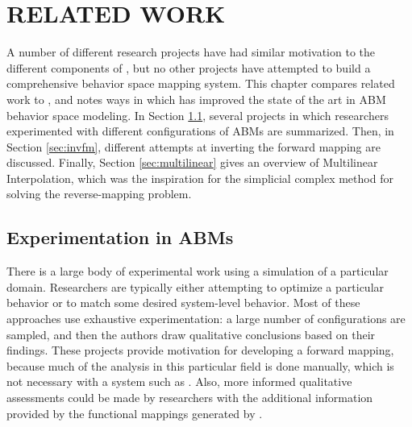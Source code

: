\chapter{RELATED WORK}
\thispagestyle{plain}

\label{RelatedWork}

A number of different research projects have had similar motivation to the different components of \fw, but no other projects have attempted to build a comprehensive behavior space mapping system.
This chapter compares related work to \fw, and notes ways in which \fw has improved the state of the art in ABM behavior space modeling.
In Section \ref{sec:abmexp}, several projects in which researchers experimented with different configurations of ABMs are summarized.
Then, in Section \ref{sec:invfm}, different attempts at inverting the forward mapping are discussed.
Finally, Section \ref{sec:multilinear} gives an overview of Multilinear Interpolation, which was the inspiration for the simplicial complex method for solving the reverse-mapping problem.

\section{Experimentation in ABMs}
\label{sec:abmexp}

There is a large body of experimental work using a simulation of a particular domain.
Researchers are typically either attempting to optimize a particular behavior or to match some desired system-level behavior.
Most of these approaches use exhaustive experimentation: a large number of configurations are sampled, and then the authors draw qualitative conclusions based on their findings.
These projects provide motivation for developing a forward mapping, because much of the analysis in this particular field is done manually, which is not necessary with a system such as \fw.
Also, more informed qualitative assessments could be made by researchers with the additional information provided by the functional mappings generated by \fw.

